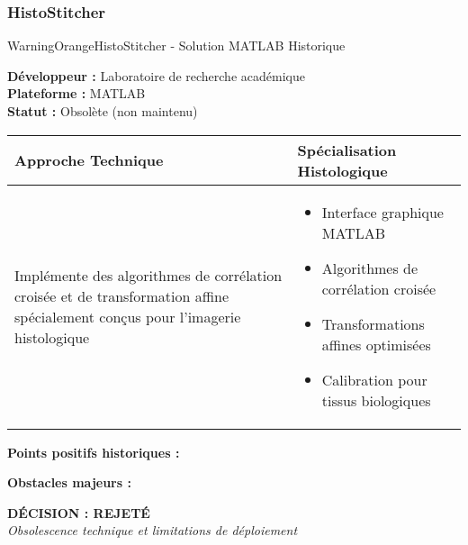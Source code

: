 \subsubsection{HistoStitcher}

\begin{techbox}{WarningOrange}{HistoStitcher - Solution MATLAB Historique}

\textbf{Développeur :} Laboratoire de recherche académique \\
\textbf{Plateforme :} MATLAB \\
\textbf{Statut :} Obsolète (non maintenu)

\vspace{0.5cm}

\begin{tabularx}{\textwidth}{|X|X|}
\hline
\rowcolor{LightGray}
\textbf{Approche Technique} & \textbf{Spécialisation Histologique} \\
\hline
Implémente des algorithmes de corrélation croisée et de transformation affine spécialement conçus pour l'imagerie histologique &
\begin{itemize}[nosep]
\item Interface graphique MATLAB
\item Algorithmes de corrélation croisée
\item Transformations affines optimisées
\item Calibration pour tissus biologiques
\end{itemize} \\
\hline
\end{tabularx}

\vspace{0.5cm}

\textbf{Points positifs historiques :}
\begin{itemize}[leftmargin=*]
\end{itemize}

\textbf{Obstacles majeurs :}
\begin{itemize}[leftmargin=*]
\end{itemize}

\begin{center}
\textbf{\textcolor{DangerRed}{DÉCISION : REJETÉ}}\\
\textit{Obsolescence technique et limitations de déploiement}
\end{center}

\end{techbox}

